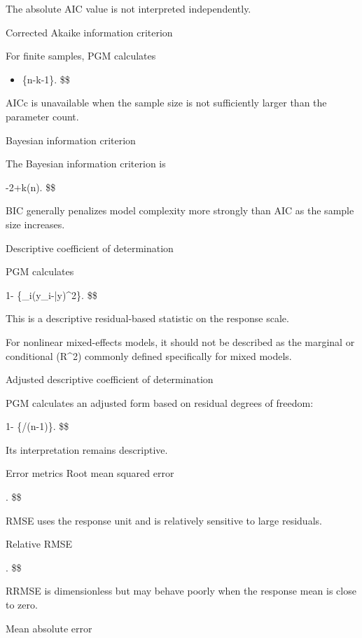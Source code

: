 \documentclass[
  english,
  letterpaper,
  DIV=11,
  numbers=noendperiod]{scrreprt}
\begin{document}
The absolute AIC value is not interpreted independently.

Corrected Akaike information criterion

For finite samples, PGM calculates


\begin{itemize}
\item

  \{n-k-1\}. \$\$
\end{itemize}

AICc is unavailable when the sample size is not sufficiently larger than
the parameter count.

Bayesian information criterion

The Bayesian information criterion is

-2\ell+k\log(n). \$\$

BIC generally penalizes model complexity more strongly than AIC as the
sample size increases.

Descriptive coefficient of determination

PGM calculates

1-  \{\sum\_i(y\_i-\bar y)\^{}2\}. \$\$

This is a descriptive residual-based statistic on the response scale.

For nonlinear mixed-effects models, it should not be described as the
marginal or conditional (R\^{}2) commonly defined specifically for mixed
models.

Adjusted descriptive coefficient of determination

PGM calculates an adjusted form based on residual degrees of freedom:

1-  \{/(n-1)\}. \$\$

Its interpretation remains descriptive.

Error metrics Root mean squared error

. \$\$

RMSE uses the response unit and is relatively sensitive to large
residuals.

Relative RMSE

. \$\$

RRMSE is dimensionless but may behave poorly when the response mean is
close to zero.

Mean absolute error
\end{document}
